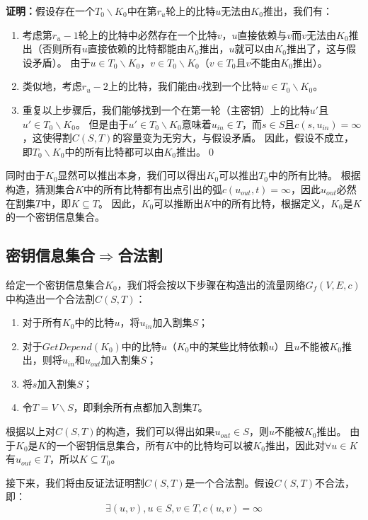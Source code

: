 \noindent
\textbf{证明：}假设存在一个$T_0\backslash K_0$中在第$r_u$轮上的比特$u$无法由$K_0$推出，我们有：
\begin{enumerate}
    \item 考虑第$r_u-1$轮上的比特中必然存在一个比特$v$，$u$直接依赖与$v$而$v$无法由$K_0$推出（否则所有$u$直接依赖的比特都能由$K_0$推出，$u$就可以由$K_0$推出了，这与假设矛盾）。
        由于$u\in T_0\backslash K_0$，$v\in T_0\backslash K_0$（$v\in T_0$且$v$不能由$K_0$推出）。
    \item 类似地，考虑$r_u-2$上的比特，我们能由$v$找到一个比特$w\in T_0\backslash K_0$。
    \item 重复以上步骤后，我们能够找到一个在第一轮（主密钥）上的比特$u'$且$u'\in T_0\backslash K_0$。
        但是由于$u'\in T_0\backslash K_0$意味着$u_{in}\in T$，而$s\in S$且$c(s,u_{in})=\infty$，这使得割$C(S,T)$的容量变为无穷大，与假设矛盾。
        因此，假设不成立，即$T_0\backslash K_0$中的所有比特都可以由$K_0$推出。\qed
\end{enumerate}

同时由于$K_0$显然可以推出本身，我们可以得出$K_0$可以推出$T_0$中的所有比特。
根据构造，猜测集合$K$中的所有比特都有出点引出的弧$c(u_{out},t)=\infty$，因此$u_{out}$必然在割集$T$中，即$K\subseteq T$。
因此，$K_0$可以推断出$K$中的所有比特，根据定义，$K_0$是$K$的一个密钥信息集合。

\subsection{密钥信息集合$\Rightarrow$合法割}
给定一个密钥信息集合$K_0$，我们将会按以下步骤在构造出的流量网络$G_f(V,E,c)$中构造出一个合法割$C(S,T)$：
\begin{enumerate}
    \item 对于所有$K_0$中的比特$u$，将$u_{in}$加入割集$S$；
    \item 对于$GetDepend(K_0)$中的比特$u$（$K_0$中的某些比特依赖$u$）且$u$不能被$K_0$推出，则将$u_{in}$和$u_{out}$加入割集$S$；
    \item 将$s$加入割集$S$；
    \item 令$T=V\backslash S$，即剩余所有点都加入割集$T$。
\end{enumerate}

根据以上对$C(S,T)$的构造，我们可以得出如果$u_{out}\in S$，则$u$不能被$K_0$推出。
由于$K_0$是$K$的一个密钥信息集合，所有$K$中的比特均可以被$K_0$推出，因此对$\forall u\in K$有$u_{out}\in T$，所以$K\subseteq T_0$。

接下来，我们将由反证法证明割$C(S,T)$是一个合法割。假设$C(S,T)$不合法，即：
$$\exists (u,v),u\in S,v\in T,c(u,v)=\infty$$

